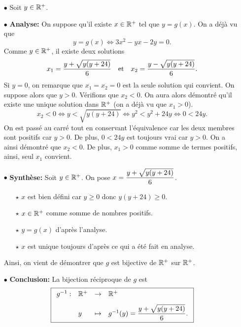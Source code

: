 \documentclass[a4paper, 11pt,reqno]{article}
\begin{document}
\begin{correction}
\begin{enumerate}
		      \begin{itemize}
			      \item[$\bullet$] Soit $y\in\mathbb{R}^+$.
			      \item[$\bullet$] \textbf{Analyse:}
				      On suppose qu'il existe $x\in\mathbb{R}^+$ tel que $y=g(x)$.
				      On a d\'ej\`a vu que
				      $$y=g(x)\Leftrightarrow 3x^2-yx-2y=0.$$
				      Comme $y\in\mathbb{R}^+$, il existe deux solutions
				      $$x_1=\displaystyle\frac{y+\sqrt{y(y+24)}}{6}\quad\hbox{et}\quad x_2=\displaystyle\frac{y-\sqrt{y(y+24)}}{6}.$$
				      Si $y=0$, on remarque que $x_1=x_2=0$ est la seule solution qui convient. On suppose alors que $y>0$. V\'erifions que $x_2<0$. On aura alors d\'emontr\'e qu'il existe une unique solution dans $\mathbb{R}^+$ (on a d\'ej\`a vu que $x_1>0$).
				      $$x_2<0\Leftrightarrow y<\sqrt{y(y+24)}\Leftrightarrow y^2<y^2+24y\Leftrightarrow 0<24y.$$
				      On est pass\'e au carr\'e tout en conservant l'\'equivalence car les deux membres sont positifs car $y>0$. De plus, $0<24y$ est toujours vrai car $y>0$. On a ainsi d\'emontr\'e que $x_2<0$. De plus, $x_1>0$ comme somme de termes positifs, ainsi, seul $x_1$ convient.
			      \item[$\bullet$] \textbf{Synth\`ese:}
				      Soit $y\in\mathbb{R}^+$. On pose $x=\displaystyle\frac{y+\sqrt{y(y+24)}}{6}$.
				      \begin{itemize}
					      \item[$\star$] $x$ est bien d\'efini car $y\geq 0$ donc $y(y+24)\geq 0$.
					      \item[$\star$]  $x\in\mathbb{R}^+$ comme somme de nombres positifs.
					      \item[$\star$]  $y=g(x)$ d'apr\`es l'analyse.
					      \item[$\star$]  $x$ est unique toujours d'apr\`es ce qui a \'et\'e fait en analyse.
				      \end{itemize}
				      Ainsi, on vient de d\'emontrer que $g$ est bijective de $\mathbb{R}^+$ sur $\mathbb{R}^+$.
			      \item[$\bullet$] \textbf{Conclusion:} 
				      La bijection r\'eciproque de $g$ est
				      $$\fbox{$\begin{array}{llll}
								      g^{-1}: & \R^+ & \rightarrow & \R^+\vsec                                 \\
								              & y    & \mapsto     & g^{-1}(y)=\ddp\frac{y+\sqrt{y(y+24)}}{6}.
							      \end{array}$}$$
		      \end{itemize}
	\end{enumerate}
\end{correction}
\end{document}
